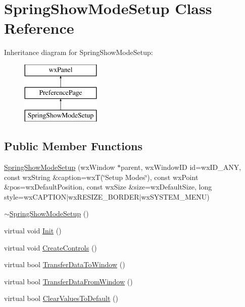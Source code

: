\hypertarget{a00144}{\section{Spring\-Show\-Mode\-Setup Class Reference}
\label{a00144}
}
Inheritance diagram for Spring\-Show\-Mode\-Setup\-:\begin{figure}[H]
\begin{center}
\leavevmode
\includegraphics[height=3.000000cm]{a00144}
\end{center}
\end{figure}
\subsection*{Public Member Functions}
\begin{DoxyCompactItemize}
\item 
\hyperlink{a00144_ae90eec0971a3c60af69e6a8ea0846c3c}{Spring\-Show\-Mode\-Setup} (wx\-Window $\ast$parent, wx\-Window\-I\-D id=wx\-I\-D\-\_\-\-A\-N\-Y, const wx\-String \&caption=wx\-T(\char`\"{}Setup Modes\char`\"{}), const wx\-Point \&pos=wx\-Default\-Position, const wx\-Size \&size=wx\-Default\-Size, long style=wx\-C\-A\-P\-T\-I\-O\-N$\vert$wx\-R\-E\-S\-I\-Z\-E\-\_\-\-B\-O\-R\-D\-E\-R$\vert$wx\-S\-Y\-S\-T\-E\-M\-\_\-\-M\-E\-N\-U)
\item 
\hyperlink{a00144_a629591db0f0298bb305e77439a6631de}{$\sim$\-Spring\-Show\-Mode\-Setup} ()
\item 
virtual void \hyperlink{a00144_a297fc79fcb3405822843c4b5d24ea7b2}{Init} ()
\item 
virtual void \hyperlink{a00144_a3ee465f459a0219876b183533c5f28ea}{Create\-Controls} ()
\item 
virtual bool \hyperlink{a00144_ad79503ccd3982d1053695ea71cd22cce}{Transfer\-Data\-To\-Window} ()
\item 
virtual bool \hyperlink{a00144_a91faa52a0e882d837b921a6c65a6d622}{Transfer\-Data\-From\-Window} ()
\item 
virtual bool \hyperlink{a00144_aff96d25209221c5e6eaab4815fddc241}{Clear\-Values\-To\-Default} ()
\end{DoxyCompactItemize}
